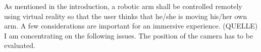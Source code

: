 As mentioned in the introduction, a robotic arm shall be controlled remotely using virtual reality so that the user thinks that he/she is moving his/her own arm. A few considerations are important for an immersive experience. (QUELLE)
I am concentrating on the following issues. 
The position of the camera has to be evaluated. 

